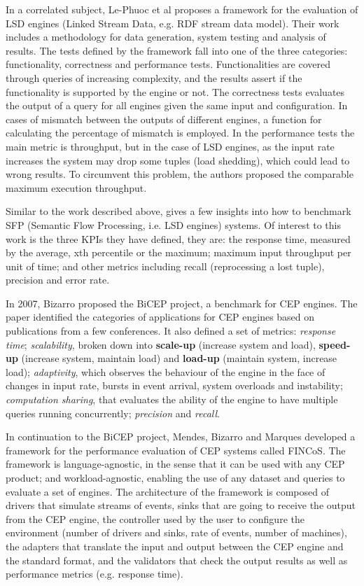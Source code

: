 \documentclass[ppgc,diss,english]{iiufrgs}
\begin{document}
In a correlated subject, Le-Phuoc et al \cite{le2012linked, le2013elastic} proposes a framework for the evaluation of LSD engines (Linked Stream Data, e.g. RDF stream data model). Their work includes a methodology for data generation, system testing and analysis of results. The tests defined by the framework fall into one of the three categories: functionality, correctness and performance tests. Functionalities are covered through queries of increasing complexity, and the results assert if the functionality is supported by the engine or not. The correctness tests evaluates the output of a query for all engines given the same input and configuration. In cases of mismatch between the outputs of different engines, a function for calculating the percentage of mismatch is employed. In the performance tests the main metric is throughput, but in the case of LSD engines, as the input rate increases the system may drop some tuples (load shedding), which could lead to wrong results. To circumvent this problem, the authors proposed the comparable maximum execution throughput.

Similar to the work described above, \cite{scharrenbach2013seven} gives a few insights into how to benchmark SFP (Semantic Flow Processing, i.e. LSD engines) systems. Of interest to this work is the three KPIs they have defined, they are: the response time, measured by the average, xth percentile or the maximum; maximum input throughput per unit of time; and other metrics including recall (reprocessing a lost tuple), precision and error rate.


In 2007, Bizarro \cite{bizarro2007bicep} proposed the BiCEP project, a benchmark for CEP engines. The paper identified the categories of applications for CEP engines based on publications from a few conferences. It also defined a set of metrics: \emph{response time}; \emph{scalability}, broken down into \textbf{scale-up} (increase system and load), \textbf{speed-up} (increase system, maintain load) and \textbf{load-up} (maintain system, increase load); \emph{adaptivity}, which observes the behaviour of the engine in the face of changes in input rate, bursts in event arrival, system overloads and instability; \emph{computation sharing}, that evaluates the ability of the engine to have multiple queries running concurrently; \emph{precision} and \emph{recall}.

In continuation to the BiCEP project, Mendes, Bizarro and Marques \cite{mendes2008framework} developed a framework for the performance evaluation of CEP systems called FINCoS. The framework is language-agnostic, in the sense that it can be used with any CEP product; and workload-agnostic, enabling the use of any dataset and queries to evaluate a set of engines. The architecture of the framework is composed of drivers that simulate streams of events, sinks that are going to receive the output from the CEP engine, the controller used by the user to configure the environment (number of drivers and sinks, rate of events, number of machines), the adapters that translate the input and output between the CEP engine and the standard format, and the validators that check the output results as well as performance metrics (e.g. response time).
\end{document}
